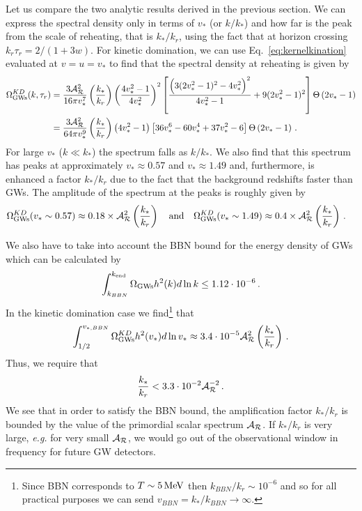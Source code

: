 \documentclass[aps,10pt,prd,groupedaddress,nofootinbib,notitlepage,eqsecnum,preprintnumbers]{revtex4-1}
\begin{document}
Let us compare the two analytic results derived in the previous section. We can express the spectral density only in terms of $v_*$ (or $k/k_*$) and how far is the peak from the scale of reheating, that is $k_*/k_r$, using the fact that at horizon crossing $k_r\tau_r=2/(1+3w)$. For kinetic domination, we can use Eq.~\eqref{eq:kernelkination} evaluated at $v=u=v_*$ to find that the spectral density at reheating is given by
\begin{align}
\Omega^{KD}_{\rm GWs}(k,\tau_r)&=\frac{3{\cal A}^2_{\cal R}}{16\pi v_*^7}\left(\frac{k_*}{k_r}\right)\left(\frac{4v^2_*-1}{4v_*^2}\right)^2\left[\frac{\Big(3(2v_*^2-1)^2-4v_*^2\Big)^2}{4v_*^2-1}+9(2v_*^2-1)^2\right]\Theta\left(2v_*-1\right)\nonumber\\&=
\frac{3{\cal A}^2_{\cal R}}{64\pi v_*^{9}}\left(\frac{k_*}{k_r}\right)\left({4v^2_*-1}\right)\left[36v_*^6-60v_*^4+37v_*^2-6\right]\Theta\left(2v_*-1\right)\,.
\end{align}
For large $v_*$ ($k\ll k_*$) the spectrum falls as $k/k_*$. We also find that this spectrum has peaks at approximately $v_*\approx0.57$ and $v_*\approx1.49$ and, furthermore, is enhanced a factor $k_*/k_r$ due to the fact that the background redshifts faster than GWs. The amplitude of the spectrum at the peaks is roughly given by
\begin{align}
\Omega^{KD}_{\rm GWs}(v_*\sim 0.57)&\approx0.18\times{\cal A}^2_{\cal R}\left(\frac{k_*}{k_r}\right)
\quad {\rm and}\quad 
\Omega^{KD}_{\rm GWs}(v_*\sim 1.49)\approx0.4\times{\cal A}^2_{\cal R}\left(\frac{k_*}{k_r}\right)\,.
\end{align}

We also have to take into account the BBN bound for the energy density of GWs which can be calculated by \cite{Maggiore:1999vm,Caprini:2018mtu}
\begin{align}
\int_{k_{BBN}}^{k_{\rm end}}\Omega_{\rm GWs}h^2(k)d\ln k\leq1.12\cdot 10^{-6}\,.
\end{align}
In the kinetic domination case we find\footnote{Since BBN corresponds to $T\sim5 \,{\rm MeV}$ then $k_{BBN}/k_r\sim 10^{-6}$ and so for all practical purposes we can send $v_{BBN}=k_*/k_{BBN}\to\infty$.} that
\begin{align}
\int_{1/2}^{v_{*,BBN}}\Omega^{KD}_{\rm GWs}h^2(v_*)d\ln v_*\approx 3.4\cdot 10^{-5}{\cal A}_{\cal R}^2\left(\frac{k_*}{k_r}\right)\,.
\end{align}
Thus, we require that
\begin{align}
\frac{k_*}{k_r}<3.3\cdot 10^{-2}{\cal A}_{\cal R}^{-2}\,.
\end{align}
We see that in order to satisfy the BBN bound, the amplification factor $k_*/k_r$ is bounded by the value of the primordial scalar spectrum ${\cal A}_{\cal R}$. If $k_*/k_r$ is very large, \textit{e.g.} for very small ${\cal A}_{\cal R}$, we would go out of the observational window in frequency for future GW detectors.
\end{document}
